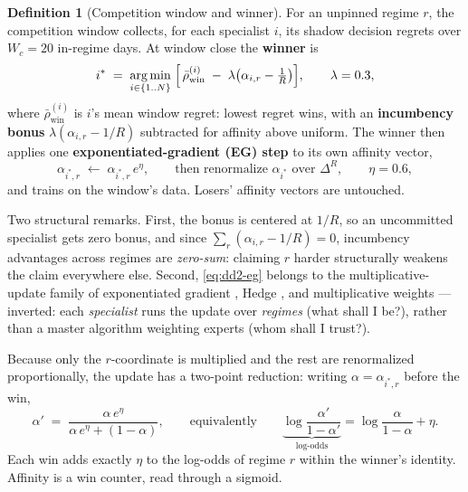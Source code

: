 \documentclass[11pt,a4paper]{article}
\theoremstyle{definition}
\newtheorem{definition}{Definition}[section]
\theoremstyle{plain}
\newcommand{\argmin}{\operatornamewithlimits{arg\,min}}
\begin{document}
\begin{definition}[Competition window and winner]
\label{def:dd2-window}
For an unpinned regime $r$, the competition window collects, for each
specialist $i$, its shadow decision regrets over $W_c = 20$ in-regime days.
At window close the \textbf{winner} is
\begin{equation}
\label{eq:dd2-winner}
i^{*} \;=\; \argmin_{i \in \{1..N\}} \;
\Bigl[\, \bar\rho^{(i)}_{\mathrm{win}}
\;-\; \lambda \bigl(\alpha_{i,r} - \tfrac{1}{R}\bigr) \Bigr],
\qquad \lambda = 0.3,
\end{equation}
where $\bar\rho^{(i)}_{\mathrm{win}}$ is $i$'s mean window regret: lowest
regret wins, with an \textbf{incumbency bonus} $\lambda(\alpha_{i,r} - 1/R)$
subtracted for affinity above uniform. The winner then applies one
\textbf{exponentiated-gradient (EG) step} to its own affinity vector,
\begin{equation}
\label{eq:dd2-eg}
\alpha_{i^{*}, r} \;\leftarrow\; \alpha_{i^{*}, r}\, e^{\eta},
\qquad \text{then renormalize } \alpha_{i^{*}} \text{ over } \Delta^{R},
\qquad \eta = 0.6,
\end{equation}
and trains on the window's data. Losers' affinity vectors are untouched.
\end{definition}

Two structural remarks. First, the bonus is centered at $1/R$, so an
uncommitted specialist gets zero bonus, and since
$\sum_r (\alpha_{i,r} - 1/R) = 0$, incumbency advantages across regimes are
\emph{zero-sum}: claiming $r$ harder structurally weakens the claim
everywhere else. Second, \eqref{eq:dd2-eg} belongs to the
multiplicative-update family of exponentiated gradient
\citep{kivinen1997exponentiated}, Hedge \citep{freund1997decision}, and
multiplicative weights \citep{arora2012multiplicative}---inverted: each
\emph{specialist} runs the update over \emph{regimes} (what shall I be?),
rather than a master algorithm weighting experts (whom shall I trust?).

Because only the $r$-coordinate is multiplied and the rest are renormalized
proportionally, the update has a two-point reduction: writing
$\alpha = \alpha_{i^{*}, r}$ before the win,
\begin{equation}
\label{eq:dd2-egclosed}
\alpha' \;=\; \frac{\alpha\, e^{\eta}}{\alpha\, e^{\eta} + (1 - \alpha)},
\qquad \text{equivalently} \qquad
\underbrace{\log \frac{\alpha'}{1 - \alpha'}}_{\text{log-odds}}
= \log \frac{\alpha}{1 - \alpha} + \eta .
\end{equation}
Each win adds exactly $\eta$ to the log-odds of regime $r$ within the
winner's identity. Affinity is a win counter, read through a sigmoid.
\end{document}
